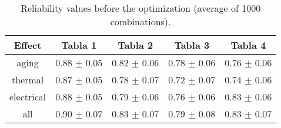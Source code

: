 \begin{table}
  \centering
  
  \caption{Reliability values before the optimization (average of 1000 combinations).}
  \label{tab:rel_no_optimization}
\begin{tabular}{c c c c c }
\hline
Effect & Tabla 1 & Tabla 2 & Tabla 3 & Tabla 4 \\
\hline
aging & 0.88 $\pm$ 0.05 & 0.82 $\pm$ 0.06 & 0.78 $\pm$ 0.06 & 0.76 $\pm$ 0.06 \\
thermal & 0.87 $\pm$ 0.05 & 0.78 $\pm$ 0.07 & 0.72 $\pm$ 0.07 & 0.74 $\pm$ 0.06 \\
electrical & 0.88 $\pm$ 0.05 & 0.79 $\pm$ 0.06 & 0.76 $\pm$ 0.06 & 0.83 $\pm$ 0.06 \\
all & 0.90 $\pm$ 0.07 & 0.83 $\pm$ 0.07 & 0.79 $\pm$ 0.08 & 0.83 $\pm$ 0.07 \\
\hline
\end{tabular}
\end{table}